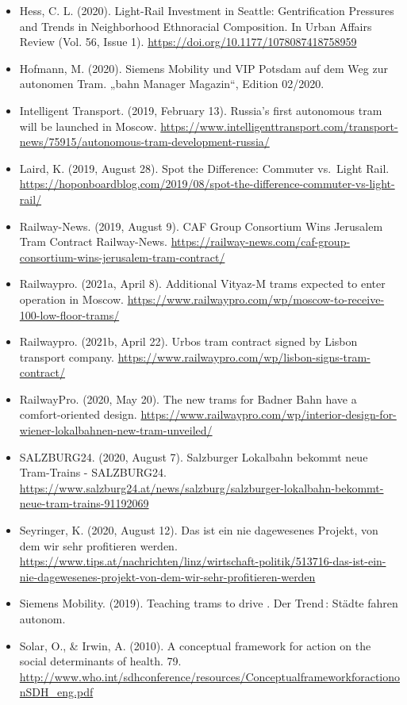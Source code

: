 \documentclass[
]{book}
\begin{document}
\begin{itemize}
\item
  Hess, C. L. (2020). Light-Rail Investment in Seattle: Gentrification Pressures and Trends in Neighborhood Ethnoracial Composition. In Urban Affairs Review (Vol. 56, Issue 1). \url{https://doi.org/10.1177/1078087418758959}
\item
  Hofmann, M. (2020). Siemens Mobility und VIP Potsdam auf dem Weg zur autonomen Tram. „bahn Manager Magazin``, Edition 02/2020.
\item
  Intelligent Transport. (2019, February 13). Russia's first autonomous tram will be launched in Moscow. \url{https://www.intelligenttransport.com/transport-news/75915/autonomous-tram-development-russia/}
\item
  Laird, K. (2019, August 28). Spot the Difference: Commuter vs.~Light Rail. \url{https://hoponboardblog.com/2019/08/spot-the-difference-commuter-vs-light-rail/}
\item
  Railway-News. (2019, August 9). CAF Group Consortium Wins Jerusalem Tram Contract \textbar{} Railway-News. \url{https://railway-news.com/caf-group-consortium-wins-jerusalem-tram-contract/}
\item
  Railwaypro. (2021a, April 8). Additional Vityaz-M trams expected to enter operation in Moscow. \url{https://www.railwaypro.com/wp/moscow-to-receive-100-low-floor-trams/}
\item
  Railwaypro. (2021b, April 22). Urbos tram contract signed by Lisbon transport company. \url{https://www.railwaypro.com/wp/lisbon-signs-tram-contract/}
\item
  RailwayPro. (2020, May 20). The new trams for Badner Bahn have a comfort-oriented design. \url{https://www.railwaypro.com/wp/interior-design-for-wiener-lokalbahnen-new-tram-unveiled/}
\item
  SALZBURG24. (2020, August 7). Salzburger Lokalbahn bekommt neue Tram-Trains - SALZBURG24. \url{https://www.salzburg24.at/news/salzburg/salzburger-lokalbahn-bekommt-neue-tram-trains-91192069}
\item
  Seyringer, K. (2020, August 12). Das ist ein nie dagewesenes Projekt, von dem wir sehr profitieren werden. \url{https://www.tips.at/nachrichten/linz/wirtschaft-politik/513716-das-ist-ein-nie-dagewesenes-projekt-von-dem-wir-sehr-profitieren-werden}
\item
  Siemens Mobility. (2019). Teaching trams to drive . Der Trend\,: Städte fahren autonom.
\item
  Solar, O., \& Irwin, A. (2010). A conceptual framework for action on the social determinants of health. 79. \url{http://www.who.int/sdhconference/resources/ConceptualframeworkforactiononSDH_eng.pdf}

\end{itemize}
\end{document}

